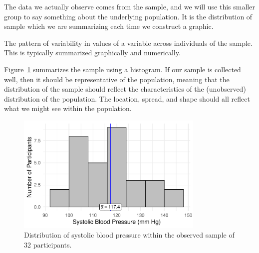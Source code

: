 \documentclass[
  letterpaper,
  DIV=11,
  numbers=noendperiod]{scrreprt}
\theoremstyle{definition}
\theoremstyle{definition}
\theoremstyle{remark}
\begin{document}
The data we actually observe comes from the sample, and we will use this
smaller group to say something about the underlying population. It is
the distribution of sample which we are summarizing each time we
construct a graphic.

\begin{tcolorbox}[enhanced jigsaw, bottomrule=.15mm, titlerule=0mm, bottomtitle=1mm, colback=white, coltitle=black, rightrule=.15mm, leftrule=.75mm, toprule=.15mm, toptitle=1mm, left=2mm, opacityback=0, colframe=quarto-callout-important-color-frame, breakable, title=\textcolor{quarto-callout-important-color}{\faExclamation}\hspace{0.5em}{Distribution of the Sample}, arc=.35mm, colbacktitle=quarto-callout-important-color!10!white, opacitybacktitle=0.6]

The pattern of variability in values of a variable across individuals of
the sample. This is typically summarized graphically and numerically.

\end{tcolorbox}

Figure~\ref{fig-distributional-quartet-sample} summarizes the sample
using a histogram. If our sample is collected well, then it should be
representative of the population, meaning that the distribution of the
sample should reflect the characteristics of the (unobserved)
distribution of the population. The location, spread, and shape should
all reflect what we might see within the population.

\begin{figure}

{\centering \includegraphics[width=0.8\textwidth,height=\textheight]{./images/fig-distributional-quartet-sample-1.pdf}

}

\caption{\label{fig-distributional-quartet-sample}Distribution of
systolic blood pressure within the observed sample of 32 participants.}

\end{figure}
\end{document}
